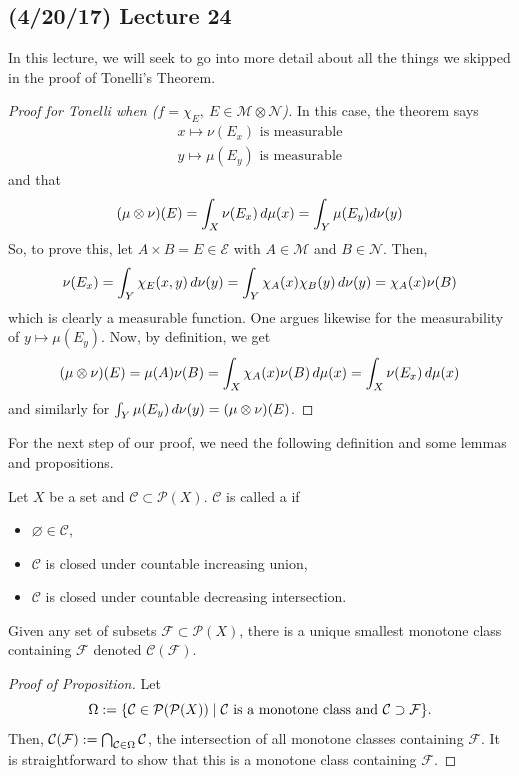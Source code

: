 \documentclass[11pt,leqno,oneside]{amsbook}
\numberwithin{thm}{section}
\renewcommand{\P}{\mathcal{P}} %
\newcommand{\M}{\mathcal{M}} %
\newcommand{\F}{\mathcal{F}}
\newcommand{\Ep}{\mathcal{E}} %
\newcommand{\cN}{\mathcal{N}}
\newcommand{\cC}{\mathcal{C}} %
\newcommand{\ox}{\otimes}
\renewcommand{\emptyset}{\varnothing}
\begin{document}
\subsection*{(4/20/17) Lecture 24}
In this lecture, we will seek to go into more detail about all the
things we skipped in the proof of Tonelli's Theorem.
\begin{proof}[Proof for Tonelli when (\(f = \chi_E,\ E \in \M \ox \cN\))]
  In this case, the theorem
    says
    \begin{align*}
      x \mapsto \nu(E_x) \text{ is measurable}\\
      y \mapsto \mu(E_y) \text{ is measurable}
    \end{align*}
    and that \[
      (\mu \ox \nu)(E) = \int_X \nu(E_x) \d\mu(x) = \int_Y \mu(E_y) d\nu(y)
    \]
    So, to prove this, let \(A \times B = E \in \Ep\) with \(A \in
    \M\) and \(B \in \cN\). Then, \[
      \nu(E_x) = \int_Y \chi_E(x,y) \, d\nu(y) = \int_Y \chi_A(x)\chi_B(y)
      \, d\nu(y) = \chi_A(x)\nu(B)
    \]
    which is clearly a measurable function. One argues likewise for the
    measurability of \(y \mapsto \mu(E_y)\). Now, by definition, we
    get \[
      (\mu \ox \nu)(E) = \mu(A)\nu(B) = \int_X \chi_A(x) \nu(B)
      \d\mu(x) = \int_X \nu(E_x) \d\mu(x)
    \]
    and similarly for \(\int_Y \mu(E_y) \d\nu(y) = (\mu \ox \nu)(E)\).
  \end{proof}
  For the next step of our proof, we need the following definition and
  some lemmas and propositions.
  \begin{defn}
    Let \(X\) be a set and \(\cC \subset \P(X)\). \(\cC\) is called a
     if
    \begin{itemize}
    \item \(\emptyset \in \cC\),
    \item \(\cC\) is closed under countable increasing union,
    \item \(\cC\) is closed under countable decreasing intersection.
    \end{itemize}
  \end{defn}
  \begin{prop}
    Given any set of subsets \(\F \subset \P(X)\), there is a unique
    smallest monotone class containing \(\F\) denoted \(\cC(\F)\). 
  \end{prop}
  \begin{proof}[Proof of Proposition]
    Let \[
\Omega := \{\cC \in \P(\P(X)) \st \cC \text{ is a monotone
      class and }\cC \supset \F\}.
  \]
  Then, \(\cC(\F) := \Intersect_{\cC \in \Omega} \cC\), the
  intersection of all monotone classes containing \(\F\). It is
  straightforward to show that this is a monotone class containing
  \(\F\). 
\end{proof}
\end{document}
